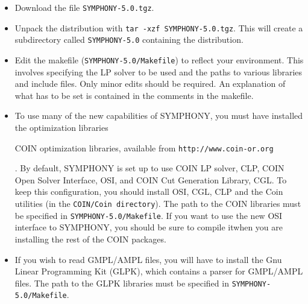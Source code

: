 \begin{itemize}

        \item Download the file {\tt SYMPHONY-5.0.tgz}.

        \item Unpack the distribution with {\tt tar -xzf
        SYMPHONY-5.0.tgz}. This will create a subdirectory called
        {\tt SYMPHONY-5.0} containing the distribution.
        
        \item Edit the makefile ({\tt SYMPHONY-5.0/Makefile}) to reflect your
              environment. This involves specifying the LP solver to be used
              and the paths to various libraries and include files. Only minor
              edits should be required. An explanation of what has to be set
              is contained in the comments in the makefile. 

        \item To use many of the new capabilities of SYMPHONY, you must have
	      installed the 
	      optimization libraries \begin{latexonly} COIN optimization
	      libraries, available from \texttt{http://www.coin-or.org}
	      \end{latexonly}.  By default, SYMPHONY is set up to use COIN LP
	      solver, CLP, COIN Open Solver Interface, OSI, and COIN Cut
	      Generation Library, CGL. To keep this configuration, you should
	      install OSI, CGL, CLP and the Coin utilities (in the
	      \texttt{COIN/Coin directory}). The path to the COIN libraries
	      must be specified in \texttt{SYMPHONY-5.0/Makefile}. If you want
	      to use the new OSI interface to SYMPHONY, you should be sure to
	      compile itwhen you are installing the rest of the COIN packages.

        \item If you wish to read GMPL/AMPL files, you will have to install
	      the Gnu Linear Programming Kit (GLPK), which contains a parser
	      for GMPL/AMPL files. The path to the GLPK libraries must be
	      specified in \texttt{SYMPHONY-5.0/Makefile}.


\end{itemize}
